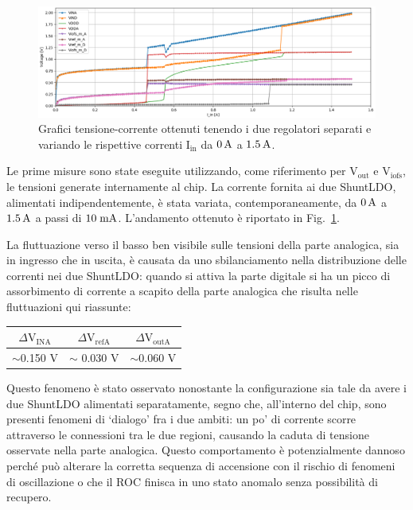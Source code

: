 \begin{figure}
\centering
\includegraphics[width=\textwidth]{Immagini/IUI2}
\caption{Grafici tensione-corrente ottenuti tenendo i due regolatori separati e variando le rispettive correnti $\mathrm{I_{in}}$ da $0\rm \, A$ a $1.5\rm \, A$.}%
\label{IUI}
\end{figure}
Le prime misure sono state eseguite utilizzando, come riferimento per $\mathrm{V_{out}}$ e $\mathrm{V_{iofs}}$, le tensioni generate internamente al chip.
La corrente fornita ai due ShuntLDO, alimentati indipendentemente, è stata variata, contemporaneamente, da $0\rm \, A$ a $1.5\rm \, A$ a passi di $10\rm \; mA$.
L'andamento ottenuto è riportato in Fig.~\ref{IUI}.

La fluttuazione verso il basso ben visibile sulle tensioni della parte analogica, sia in ingresso che in uscita, è causata da uno sbilanciamento nella distribuzione delle correnti nei due ShuntLDO: quando si attiva la parte digitale si ha un picco di assorbimento di corrente a scapito della parte analogica che risulta nelle fluttuazioni qui riassunte:
\begin{center}
\begin{tabular}{ccc}
\hline
$\Delta \mathrm{V_{INA}}$ & $\Delta \mathrm{V_{refA}}$ &$\Delta \mathrm{V_{outA}}$  \\ \hline
$\sim$0.150 V & $\sim$ 0.030 V& $\sim$0.060 V\\ \hline     
\end{tabular}
\end{center}
Questo fenomeno è stato osservato nonostante la configurazione sia tale da avere i due ShuntLDO alimentati separatamente, segno che, all'interno del chip, sono presenti fenomeni di `dialogo' fra i due ambiti: un po' di corrente scorre attraverso le connessioni tra le due regioni, causando la caduta di tensione osservate nella parte analogica.
Questo comportamento è potenzialmente dannoso perch\'e pu\`o alterare la corretta sequenza di accensione con il rischio di fenomeni di oscillazione o che il ROC finisca in uno stato anomalo senza possibilit\`a di recupero.

